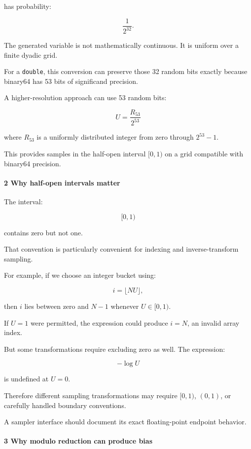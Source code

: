 has probability:

\[
 \frac1{2^{32}}.
\]

The generated variable is not mathematically continuous. It is uniform over a finite dyadic grid.

For a \texttt{double}, this conversion can preserve those 32 random bits exactly because binary64 has 53 bits of significand precision.

A higher-resolution approach can use 53 random bits:

\[
 \boxed{ U=\frac{R_{53}}{2^{53}} }
\]

where \(R_{53}\) is a uniformly distributed integer from zero through \(2^{53}-1\).

This provides samples in the half-open interval \([0,1)\) on a grid compatible with binary64 precision.

\paragraph{2 Why half-open intervals matter}\label{why-half-open-intervals-matter}

The interval:

\[
 [0,1)
\]

contains zero but not one.

That convention is particularly convenient for indexing and inverse-transform sampling.

For example, if we choose an integer bucket using:

\[
 i=\lfloor NU\rfloor,
\]

then \(i\) lies between zero and \(N-1\) whenever \(U\in[0,1)\).

If \(U=1\) were permitted, the expression could produce \(i=N\), an invalid array index.

But some transformations require excluding zero as well. The expression:

\[
 -\log U
\]

is undefined at \(U=0\).

Therefore different sampling transformations may require \([0,1)\), \((0,1)\), or carefully handled boundary conventions.

A sampler interface should document its exact floating-point endpoint behavior.

\paragraph{3 Why modulo reduction can produce bias}\label{why-modulo-reduction-can-produce-bias}


